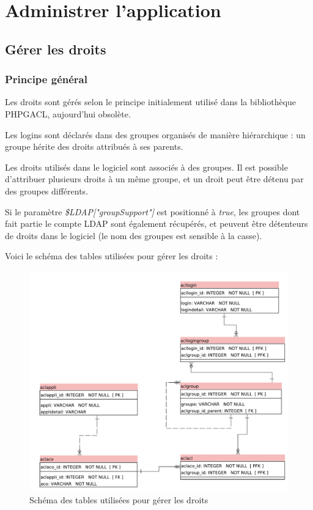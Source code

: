 \chapter{Administrer l'application}

\section{Gérer les droits}
\label{droits}

\subsection{Principe général}

Les droits sont gérés selon le principe initialement utilisé dans la bibliothèque PHPGACL, aujourd'hui obsolète. 

Les logins sont déclarés dans des groupes organisés de manière hiérarchique : un groupe hérite des droits attribués à ses parents.

Les droits utilisés dans le logiciel sont associés à des groupes. Il est possible d'attribuer plusieurs droits à un même groupe, et un droit peut être détenu par des groupes différents.

Si le paramètre \textit{\$LDAP["groupSupport"]} est positionné à \textit{true}, les groupes dont fait partie le compte LDAP sont également récupérés, et peuvent être détenteurs de droits dans le logiciel (le nom des groupes est sensible à la casse).

Voici le schéma des tables utilisées pour gérer les droits :

\begin{figure}[H]
\includegraphics[width=\linewidth]{images/acl_only}
\caption{Schéma des tables utilisées pour gérer les droits}
\end{figure}

